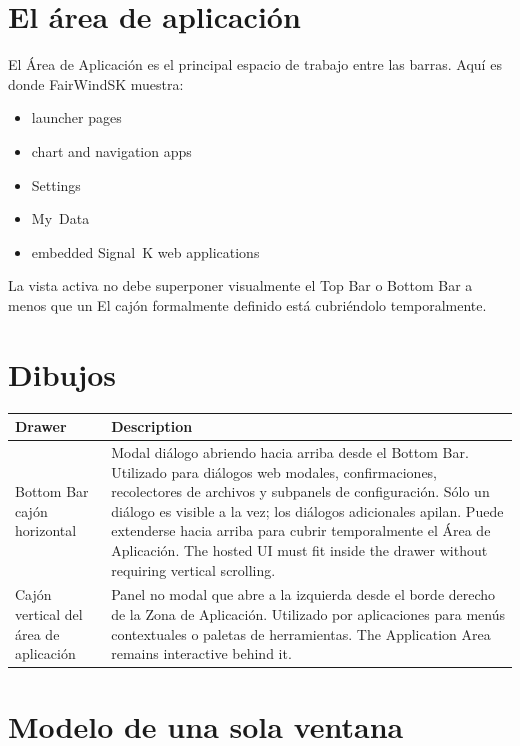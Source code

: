 
\section{El área de aplicación}

El Área de Aplicación es el principal espacio de trabajo entre las barras.
Aquí es donde FairWindSK muestra:

\begin{itemize}
  \item launcher pages
  \item chart and navigation apps
  \item Settings
  \item My~Data
  \item embedded Signal~K web applications
\end{itemize}

La vista activa no debe superponer visualmente el Top Bar o Bottom Bar a menos que un
El cajón formalmente definido está cubriéndolo temporalmente.

\section{Dibujos}

\begin{longtable}{L{4.0cm}L{9.7cm}}
\toprule
{}
\color{white}\sffamily\bfseries Drawer &
\color{white}\sffamily\bfseries Description \\
\midrule
Bottom Bar cajón horizontal&
Modal diálogo abriendo hacia arriba desde el Bottom Bar.
Utilizado para diálogos web modales, confirmaciones, recolectores de archivos y subpanels de configuración.
Sólo un diálogo es visible a la vez; los diálogos adicionales apilan.
Puede extenderse hacia arriba para cubrir temporalmente el Área de Aplicación.
  The hosted UI must fit inside the drawer without requiring vertical scrolling. \\
Cajón vertical del área de aplicación&
Panel no modal que abre a la izquierda desde el borde derecho de la Zona de Aplicación.
Utilizado por aplicaciones para menús contextuales o paletas de herramientas.
  The Application Area remains interactive behind it. \\
\bottomrule
\end{longtable}

\section{Modelo de una sola ventana}

